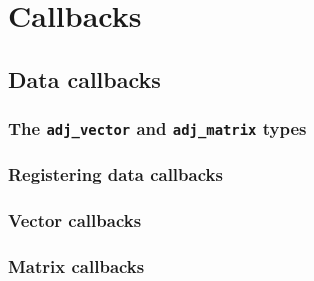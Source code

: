 \chapter{Callbacks}

\begin{synopsis}
\end{synopsis}
\minitoc
\vspace{\fill}
\newpage

\section{Data callbacks}
\subsection{The \texttt{adj_vector} and \texttt{adj_matrix} types}
\subsection{Registering data callbacks}
\subsection{Vector callbacks}
\subsection{Matrix callbacks}
